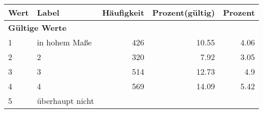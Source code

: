      \begin{longtable}{lXrrr}
     \toprule
     \textbf{Wert} & \textbf{Label} & \textbf{Häufigkeit} & \textbf{Prozent(gültig)} & \textbf{Prozent} \\
     \endhead
     \midrule
     \multicolumn{5}{l}{\textbf{Gültige Werte}}\\

     1 &
     \multicolumn{1}{X}{ in hohem Maße   } &


       \num{426} &
       \num[round-mode=places,round-precision=2]{10.55} &
         \num[round-mode=places,round-precision=2]{4.06} \\

     2 &
     \multicolumn{1}{X}{ 2   } &


       \num{320} &
       \num[round-mode=places,round-precision=2]{7.92} &
         \num[round-mode=places,round-precision=2]{3.05} \\

     3 &
     \multicolumn{1}{X}{ 3   } &


       \num{514} &
       \num[round-mode=places,round-precision=2]{12.73} &
         \num[round-mode=places,round-precision=2]{4.9} \\

     4 &
     \multicolumn{1}{X}{ 4   } &


       \num{569} &
       \num[round-mode=places,round-precision=2]{14.09} &
         \num[round-mode=places,round-precision=2]{5.42} \\

     5 &
     \multicolumn{1}{X}{ überhaupt nicht   } &



\end{longtable}
